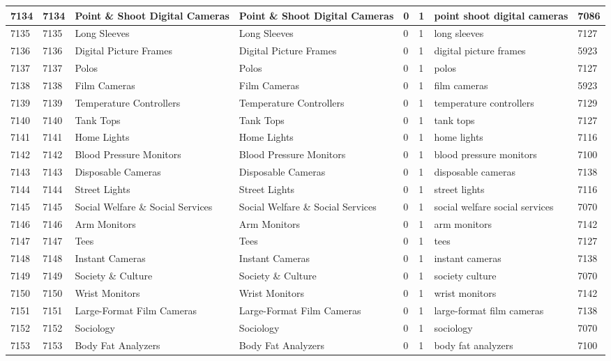 \begin{longtable}{|l|l|l|l|l|l|l|l|}
7134 & 7134 & Point \& Shoot Digital Cameras & Point \& Shoot Digital Cameras & 0 & 1 & point shoot digital cameras & 7086 \\ \hline 
7135 & 7135 & Long Sleeves & Long Sleeves & 0 & 1 & long sleeves & 7127 \\ \hline 
7136 & 7136 & Digital Picture Frames & Digital Picture Frames & 0 & 1 & digital picture frames & 5923 \\ \hline 
7137 & 7137 & Polos & Polos & 0 & 1 & polos & 7127 \\ \hline 
7138 & 7138 & Film Cameras & Film Cameras & 0 & 1 & film cameras & 5923 \\ \hline 
7139 & 7139 & Temperature Controllers & Temperature Controllers & 0 & 1 & temperature controllers & 7129 \\ \hline 
7140 & 7140 & Tank Tops & Tank Tops & 0 & 1 & tank tops & 7127 \\ \hline 
7141 & 7141 & Home Lights & Home Lights & 0 & 1 & home lights & 7116 \\ \hline 
7142 & 7142 & Blood Pressure Monitors & Blood Pressure Monitors & 0 & 1 & blood pressure monitors & 7100 \\ \hline 
7143 & 7143 & Disposable Cameras & Disposable Cameras & 0 & 1 & disposable cameras & 7138 \\ \hline 
7144 & 7144 & Street Lights & Street Lights & 0 & 1 & street lights & 7116 \\ \hline 
7145 & 7145 & Social Welfare \& Social Services & Social Welfare \& Social Services & 0 & 1 & social welfare social services & 7070 \\ \hline 
7146 & 7146 & Arm Monitors & Arm Monitors & 0 & 1 & arm monitors & 7142 \\ \hline 
7147 & 7147 & Tees & Tees & 0 & 1 & tees & 7127 \\ \hline 
7148 & 7148 & Instant Cameras & Instant Cameras & 0 & 1 & instant cameras & 7138 \\ \hline 
7149 & 7149 & Society \& Culture & Society \& Culture & 0 & 1 & society culture & 7070 \\ \hline 
7150 & 7150 & Wrist Monitors & Wrist Monitors & 0 & 1 & wrist monitors & 7142 \\ \hline 
7151 & 7151 & Large-Format Film Cameras & Large-Format Film Cameras & 0 & 1 & large-format film cameras & 7138 \\ \hline 
7152 & 7152 & Sociology & Sociology & 0 & 1 & sociology & 7070 \\ \hline 
7153 & 7153 & Body Fat Analyzers & Body Fat Analyzers & 0 & 1 & body fat analyzers & 7100 \\ \hline 

\end{longtable}
